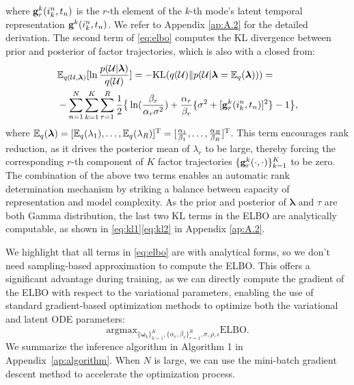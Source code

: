 where $\mathbf{g}^k_r(i_k^n, t_n)$ is the $r$-th element of the $k$-th mode's latent temporal representation $\mathbf{g}^k(i_k^n, t_n)$. We refer to Appendix \ref{ap:A.2} for the detailed derivation. 
The second term of \eqref{eq:elbo} computes the KL divergence between prior and posterior of factor trajectories, which is also with a closed from:
\vspace{-2mm}
\begin{align}
    &\mathbb{E}_{q(\mathcal{U}, \boldsymbol{\lambda})}[\ln 
    \frac{p(\mathcal{U}|\boldsymbol{\lambda})}{q(\mathcal{U})}]= -\text{KL}(q(\mathcal{U}) \| p(\mathcal{U}|\boldsymbol{\lambda}=\mathbb{E}_q(\boldsymbol{\lambda})))=\nonumber \\
    &-\sum_{n=1}^N \sum_{k=1}^K\sum_{r=1}^R \frac{1}{2}\big\{\ln(\frac{\beta_r}{\alpha_r\sigma^2})+ \frac{\alpha_r}{\beta_r}\{\sigma^2+[\mathbf{g}^k_r(i_k^n, t_n)]^2\}-1\big\}, \label{term2}
\end{align}
where $\mathbb{E}_q(\boldsymbol{\lambda})=[\mathbb{E}_q({\lambda_1}),\ldots,\mathbb{E}_q({\lambda_R})]^{\mathrm{T}}=[\frac{\alpha_1}{\beta_1},\ldots,\frac{\alpha_R}{\beta_R}]^{\mathrm{T}}$.
This term encourages rank reduction,  as it drives the 
posterior mean of $\lambda_r$  to be large, thereby forcing the corresponding $r$-th component of $K$ factor trajectories $\{\mathbf{g}^{k}_r(\cdot, \cdot)\}_{k=1}^K$ to be zero. The combination of the above two terms enables an automatic rank determination mechanism by striking a balance between capacity of representation and model complexity. 
As the prior and posterior of $\boldsymbol{\lambda}$ and $\tau$ are both Gamma distribution, the last two KL terms in the ELBO are analytically computable, as shown in \eqref{eq:kl1}\eqref{eq:kl2} in Appendix \ref{ap:A.2}.




We highlight that all terms in \eqref{eq:elbo} are with analytical forms, so we don't need sampling-based approximation to compute the ELBO. 
This offers a significant advantage during training, as we can directly compute the gradient of the ELBO with respect to the variational parameters, enabling the use of standard gradient-based optimization methods to optimize both the variational and latent ODE parameters:
\begin{equation} 
    \text{argmax}_{\{\boldsymbol{\omega}_k\}_{k=1}^K, \{\alpha_r, \beta_r\}_{r=1}^{R}, \sigma, \rho, \iota} \text{ELBO}.
    \label{eq:loss}
\end{equation}
We summarize the inference algorithm in Algorithm 1 in Appendix~\ref{ap:algorithm}. 
When $N$ is large, we can use the mini-batch gradient descent method to accelerate the optimization process.

